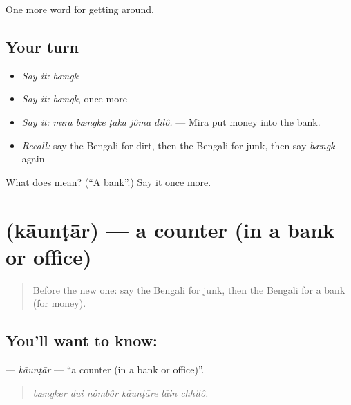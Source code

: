 \begin{grammarlens}[title={What you've built}]
One more word for getting around.
\end{grammarlens}

\subsection*{Your turn}
\begin{itemize}
\raggedright
  \item \emph{Say it:} \emph{bængk}
  \item \emph{Say it:} \emph{bængk}, once more
  \item \emph{Say it:} \emph{mīrā bængke ṭākā jômā dilô.} — Mira put money into the bank.
  \item \emph{Recall:} say the Bengali for dirt, then the Bengali for junk, then say \emph{bængk} again
\end{itemize}

\begin{tcolorbox}[breakable,colback=teal!4,colframe=teal!35!black,title={Before you move on}]
What does  mean? (\textquotedblleft{}A bank\textquotedblright{}.) Say it once more.
\end{tcolorbox}
\section[\texorpdfstring{\bn{কাউন্টার} (kāunṭār)}{কাউন্টার (kāunṭār)}]{ (kāunṭār) — a counter (in a bank or office)}

\label{lesson:BN-C414-kauntar}



\begin{quote}
Before the new one: say the Bengali for junk, then the Bengali for a bank (for money).
\end{quote}

\subsection*{You'll want to know: }
\textbf{} — \emph{kāunṭār} — \textquotedblleft{}a counter (in a bank or office)\textquotedblright{}.

\begin{quote}
     
\end{quote}

\begin{quote}
\emph{bængker dui nômbôr kāunṭāre lāin chhilô.}
\end{quote}

